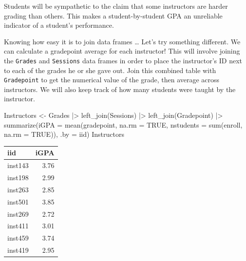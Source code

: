 \documentclass[
  letterpaper,
  DIV=11,
  numbers=noendperiod,
  oneside]{scrartcl}
\newenvironment{Shaded}{\begin{snugshade}}{\end{snugshade}}
\newcommand{\AttributeTok}[1]{\textcolor[rgb]{0.40,0.45,0.13}{#1}}
\newcommand{\ConstantTok}[1]{\textcolor[rgb]{0.56,0.35,0.01}{#1}}
\newcommand{\FunctionTok}[1]{\textcolor[rgb]{0.28,0.35,0.67}{#1}}
\newcommand{\NormalTok}[1]{\textcolor[rgb]{0.00,0.23,0.31}{#1}}
\newcommand{\OtherTok}[1]{\textcolor[rgb]{0.00,0.23,0.31}{#1}}
\newcommand{\SpecialCharTok}[1]{\textcolor[rgb]{0.37,0.37,0.37}{#1}}
\begin{document}
\begin{tcolorbox}[enhanced jigsaw, colbacktitle=quarto-callout-note-color!10!white, opacityback=0, breakable, opacitybacktitle=0.6, colback=white, coltitle=black, arc=.35mm, title=\textcolor{quarto-callout-note-color}{\faInfo}\hspace{0.5em}{Case study: What about the instructor?}, left=2mm, colframe=quarto-callout-note-color-frame, rightrule=.15mm, bottomrule=.15mm, leftrule=.75mm, bottomtitle=1mm, toptitle=1mm, titlerule=0mm, toprule=.15mm]

Students will be sympathetic to the claim that some instructors are
harder grading than others. This makes a student-by-student GPA an
unreliable indicator of a student's performance.

Knowing how easy it is to join data frames \ldots{} Let's try something
different. We can calculate a gradepoint average for each instructor!
This will involve joining the \texttt{Grades} and \texttt{Sessions} data
frames in order to place the instructor's ID next to each of the grades
he or she gave out. Join this combined table with \texttt{Gradepoint} to
get the numerical value of the grade, then average across instructors.
We will also keep track of how many students were taught by the
instructor.

\begin{Shaded}
\begin{Highlighting}[]
\NormalTok{Instructors }\OtherTok{\textless{}{-}}\NormalTok{ Grades }\SpecialCharTok{|\textgreater{}} 
  \FunctionTok{left\_join}\NormalTok{(Sessions) }\SpecialCharTok{|\textgreater{}}
  \FunctionTok{left\_join}\NormalTok{(Gradepoint) }\SpecialCharTok{|\textgreater{}}
  \FunctionTok{summarize}\NormalTok{(}\AttributeTok{iGPA =} \FunctionTok{mean}\NormalTok{(gradepoint, }\AttributeTok{na.rm =} \ConstantTok{TRUE}\NormalTok{, }
                        \AttributeTok{nstudents =} \FunctionTok{sum}\NormalTok{(enroll, }\AttributeTok{na.rm =} \ConstantTok{TRUE}\NormalTok{)), }\AttributeTok{.by =}\NormalTok{ iid) }
\NormalTok{Instructors}
\end{Highlighting}
\end{Shaded}

\begin{tabular}{l|r}
\hline
iid & iGPA\\
\hline
inst143 & 3.76\\
\hline
inst198 & 2.99\\
\hline
inst263 & 2.85\\
\hline
inst501 & 3.85\\
\hline
inst269 & 2.72\\
\hline
inst411 & 3.01\\
\hline
inst459 & 3.74\\
\hline
inst419 & 2.95\\
\hline
\end{tabular}

\end{tcolorbox}
\end{document}

